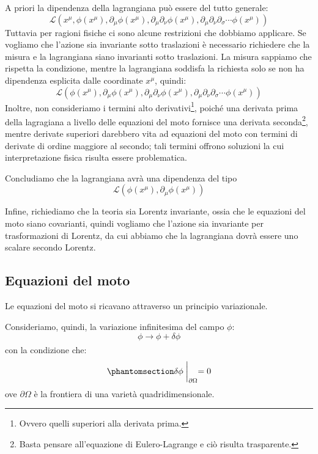 A priori la dipendenza della lagrangiana può essere del tutto generale:
\begin{equation}
    \mathcal{L}\left(x^\mu,\phi(x^\mu),\partial_\mu\phi(x^\mu),\partial_\mu\partial_\nu\phi(x^\mu),\partial_\mu\partial_\nu\partial_\sigma \cdots\phi(x^\mu)\right)
\end{equation}
Tuttavia per ragioni fisiche ci sono alcune restrizioni che dobbiamo applicare.
Se vogliamo che l'azione sia invariante sotto traslazioni è necessario richiedere che la misura e la lagrangiana siano invarianti sotto traslazioni. La misura sappiamo che rispetta la condizione, mentre la lagrangiana soddisfa la richiesta solo se non ha dipendenza esplicita dalle coordinate $x^\mu$, quindi: 
\begin{equation}
    \mathcal{L}\left(\phi(x^\mu),\partial_\mu\phi(x^\mu),\partial_\mu\partial_\nu\phi(x^\mu),\partial_\mu\partial_\nu\partial_\sigma \cdots\phi(x^\mu)\right)
\end{equation}
Inoltre, non consideriamo i termini alto derivativi\footnote{Ovvero quelli superiori alla derivata prima.}, poiché una derivata prima della lagragiana a livello delle equazioni del moto fornisce una derivata seconda\footnote{Basta pensare all'equazione di Eulero-Lagrange e ciò risulta trasparente.}, mentre derivate superiori darebbero vita ad equazioni del moto con termini di derivate di ordine maggiore al secondo; tali termini offrono soluzioni la cui interpretazione fisica risulta essere problematica. 

Concludiamo che la lagrangiana avrà una dipendenza del tipo
\begin{equation}
    \mathcal{L}\left(\phi(x^\mu),\partial_\mu\phi(x^\mu)\right)
\end{equation}

Infine, richiediamo che la teoria sia Lorentz invariante, ossia che le equazioni del moto siano covarianti, quindi vogliamo che l'azione sia invariante per trasformazioni di Lorentz, da cui abbiamo che la lagrangiana dovrà essere uno scalare secondo Lorentz.


\subsection{Equazioni del moto}
Le equazioni del moto si ricavano attraverso un principio variazionale.

Consideriamo, quindi, la variazione infinitesima del campo $\phi$:
\begin{equation}
  \phi\xrightarrow[\text{}]{\text{}}\phi+\delta \phi
\end{equation}
con la condizione che:
\begin{equation}\phantomsection\label{eq:con_var}
  \delta\phi\biggm|_{\partial\Omega }=0 
\end{equation}
ove $\partial\Omega$ è la frontiera di una varietà quadridimensionale. 

